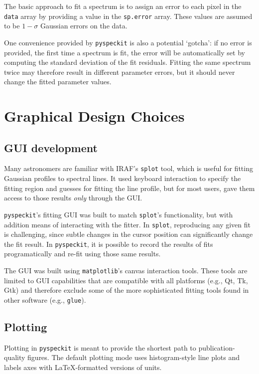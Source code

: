 \documentclass[twocolumn]{aastex61}
\newcommand{\pyspeckit}{\texttt{pyspeckit}\xspace}
\begin{document}
The basic approach to fit a spectrum is to assign an error to each pixel in the
\texttt{data} array by providing a value in the \texttt{sp.error} array.  These
values are assumed to be $1-\sigma$ Gaussian errors on the data.

One convenience provided by \pyspeckit is also a potential `gotcha': if no
error is provided, the first time a spectrum is fit, the error will be
automatically set by computing the standard deviation of the fit residuals.
Fitting the same spectrum twice may therefore result in different parameter
errors, but it should never change the fitted parameter values.


\section{Graphical Design Choices}
\label{sec:gui}
\subsection{GUI development}
Many astronomers are familiar with IRAF's \texttt{splot} tool, which is useful
for fitting Gaussian profiles to spectral lines.  It used keyboard interaction
to specify the fitting region and guesses for fitting the line profile, but for
most users, gave them access to those results \emph{only} through the GUI.

\texttt{pyspeckit}'s fitting GUI was built to match \texttt{splot}'s
functionality, but with addition means of interacting with the fitter.  In
\texttt{splot}, reproducing any given fit is challenging, since subtle changes
in the cursor position can significantly change the fit result.  In \pyspeckit,
it is possible to record the results of fits programatically and re-fit using
those same results.

The GUI was built using \texttt{matplotlib}'s canvas interaction tools.  These
tools are limited to GUI capabilities that are compatible with all platforms
(e.g., Qt, Tk, Gtk) and therefore exclude some of the more sophisticated fitting
tools found in other software (e.g., \texttt{glue}).

\subsection{Plotting}
Plotting in \pyspeckit is meant to provide the shortest path to
publication-quality figures.  The default plotting mode uses histogram-style
line plots and labels axes with \LaTeX-formatted versions of units.
\end{document}
